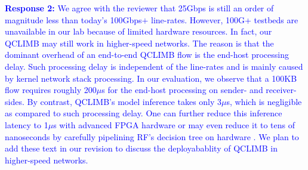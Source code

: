 \documentclass[12pt,one-column]{article}
\begin{document}
\noindent\textcolor{blue}{\textbf{Response 2:} We agree with the reviewer that 25Gbps is still an order of magnitude less than today's 100Gbps$+$ line-rates. However, 100G+ testbeds are unavailable in our lab because of limited hardware resources. 
	In fact, our QCLIMB may still work in higher-speed networks.
	The reason is that the dominant overhead of an end-to-end QCLIMB flow is the end-host processing delay.
	Such processing delay is independent of the line-rates and is mainly caused by kernel network stack processing.
	In our evaluation, we observe that a 100KB flow requires roughly 200$\mu$s for the end-host processing on sender- and receiver-sides.
	By contrast, QCLIMB's model inference takes only 3$\mu$s, which is negligible as compared to such processing delay.
	One can further reduce this inference latency to 1$\mu$s with advanced FPGA hardware \cite{dhukic2019advance} or may even reduce it to tens of nanoseconds by carefully pipelining RF's decision tree on hardware \cite{Rashelbach2020a}. 
	We plan to add these text in our revision to discuss the deployabablity of QCLIMB in higher-speed networks.
}





\begin{spacing}{-1.0}

\vspace{-0.1in}

\end{spacing}
\end{document}
